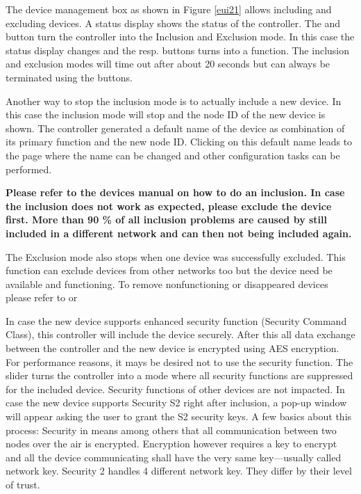 The device management box as shown in Figure \ref{eui21} allows including and excluding 
\zwave devices. A status display shows the status of the controller. The  
and  button turn the controller into the Inclusion and Exclusion mode. In 
this case the status display changes and the resp. buttons turns into a  function. 
The inclusion and exclusion modes will time out after about 20 seconds but can always be 
terminated using the  buttons.

Another way to stop the inclusion mode is to actually include a new device. In this case
 the inclusion mode will stop and the node ID of the new device is shown. The controller 
 generated a default name of the device as combination of its primary function and the 
 new node ID. Clicking on this default name leads to the  page where the 
 name can be changed and other configuration tasks can be performed.

\textbf{Please refer to the devices manual on how to do an inclusion. In case the 
inclusion does not work as expected, please exclude the device first. More than 90 \% of 
all inclusion problems are caused by still included in a different network and can then 
not being included again.}

The Exclusion mode also stops when one device was successfully excluded. This function 
can exclude devices from other networks too but the device need be available and 
functioning. To remove nonfunctioning or disappeared devices please refer to 
 or 

In case the new device supports enhanced security function (Security Command Class), this 
controller will include the device securely. After this all data exchange between the 
controller and the new device is encrypted using AES encryption. For performance reasons, 
it mays be desired not to use the security function. The slider  
turns the controller into a mode where all security functions are suppressed for the included 
device. Security functions of other devices are not impacted. In case the new device supports 
Security S2 right after inclusion, a pop-up window will appear asking the user to grant the 
S2 security keys.
A few basics about this process: Security in \zwave means among others that all 
communication between two nodes over the air is encrypted. Encryption however requires 
a key to encrypt and all the device communicating shall have the very same key---usually 
called network key. \zwave Security 2 handles 4 different network key. They differ by 
their level of trust.

